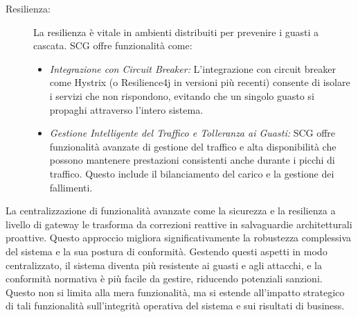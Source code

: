\begin{description}
    \item[Resilienza:] La resilienza è vitale in ambienti distribuiti per prevenire i guasti a cascata. SCG offre funzionalità come:
    \begin{itemize}
        \item \textit{Integrazione con Circuit Breaker:} L'integrazione con circuit breaker come Hystrix (o Resilience4j in versioni più recenti) consente di isolare i servizi che non rispondono, evitando che un singolo guasto si propaghi attraverso l'intero sistema.
        \item \textit{Gestione Intelligente del Traffico e Tolleranza ai Guasti:} SCG offre funzionalità avanzate di gestione del traffico e alta disponibilità che possono mantenere prestazioni consistenti anche durante i picchi di traffico. Questo include il bilanciamento del carico e la gestione dei fallimenti.
    \end{itemize}
\end{description}
La centralizzazione di funzionalità avanzate come la sicurezza e la resilienza a livello di gateway le trasforma da correzioni reattive in salvaguardie architetturali proattive. Questo approccio migliora significativamente la robustezza complessiva del sistema e la sua postura di conformità. Gestendo questi aspetti in modo centralizzato, il sistema diventa più resistente ai guasti e agli attacchi, e la conformità normativa è più facile da gestire, riducendo potenziali sanzioni. Questo non si limita alla mera funzionalità, ma si estende all'impatto strategico di tali funzionalità sull'integrità operativa del sistema e sui risultati di business.